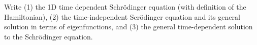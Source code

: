 

\vspace*{\fill}
\centering

Write (1) the 1D time dependent Schr\"{o}dinger equation (with definition of the Hamiltonian), (2) the time-independent Scr\"{o}dinger equation and its general solution in terms of eigenfunctions, and (3) the general time-dependent solution to the Schr\"{o}dinger equation.

\centering
\vspace*{\fill}

